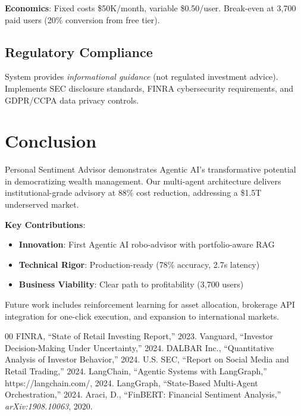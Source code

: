 \documentclass[conference]{IEEEtran}
\begin{document}
    \textbf{Economics}: Fixed costs \$50K/month, variable \$0.50/user. Break-even at 3,700 paid users (20\% conversion from free tier).

    \subsection{Regulatory Compliance}
    System provides \textit{informational guidance} (not regulated investment advice). Implements SEC disclosure standards, FINRA cybersecurity requirements, and GDPR/CCPA data privacy controls.

    \section{Conclusion}

    Personal Sentiment Advisor demonstrates Agentic AI's transformative potential in democratizing wealth management. Our multi-agent architecture delivers institutional-grade advisory at 88\% cost reduction, addressing a \$1.5T underserved market.

    \textbf{Key Contributions}:
    \begin{itemize}
        \item \textbf{Innovation}: First Agentic AI robo-advisor with portfolio-aware RAG
        \item \textbf{Technical Rigor}: Production-ready (78\% accuracy, 2.7s latency)
        \item \textbf{Business Viability}: Clear path to profitability (3,700 users)
    \end{itemize}

    Future work includes reinforcement learning for asset allocation, brokerage API integration for one-click execution, and expansion to international markets.

    \begin{thebibliography}{00}
     FINRA, ``State of Retail Investing Report,'' 2023.
     Vanguard, ``Investor Decision-Making Under Uncertainty,'' 2024.
     DALBAR Inc., ``Quantitative Analysis of Investor Behavior,'' 2024.
     U.S. SEC, ``Report on Social Media and Retail Trading,'' 2024.
     LangChain, ``Agentic Systems with LangGraph,'' https://langchain.com/, 2024.
     LangGraph, ``State-Based Multi-Agent Orchestration,'' 2024.
     Araci, D., ``FinBERT: Financial Sentiment Analysis,'' \textit{arXiv:1908.10063}, 2020.
    \end{thebibliography}
    
\end{document}
